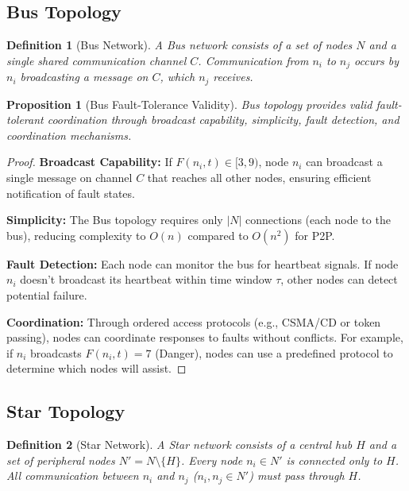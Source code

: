 \documentclass{article}
\newtheorem{proposition}[theorem]{Proposition}
\newtheorem{definition}{Definition}
\begin{document}
\subsection{Bus Topology}

\begin{definition}[Bus Network]
A Bus network consists of a set of nodes $N$ and a single shared communication channel $C$. Communication from $n_i$ to $n_j$ occurs by $n_i$ broadcasting a message on $C$, which $n_j$ receives.
\end{definition}

\begin{proposition}[Bus Fault-Tolerance Validity]
Bus topology provides valid fault-tolerant coordination through broadcast capability, simplicity, fault detection, and coordination mechanisms.
\end{proposition}

\begin{proof}
\textbf{Broadcast Capability:} If $F(n_i, t) \in [3, 9)$, node $n_i$ can broadcast a single message on channel $C$ that reaches all other nodes, ensuring efficient notification of fault states.

\textbf{Simplicity:} The Bus topology requires only $|N|$ connections (each node to the bus), reducing complexity to $O(n)$ compared to $O(n^2)$ for P2P.

\textbf{Fault Detection:} Each node can monitor the bus for heartbeat signals. If node $n_i$ doesn't broadcast its heartbeat within time window $\tau$, other nodes can detect potential failure.

\textbf{Coordination:} Through ordered access protocols (e.g., CSMA/CD or token passing), nodes can coordinate responses to faults without conflicts. For example, if $n_i$ broadcasts $F(n_i, t) = 7$ (Danger), nodes can use a predefined protocol to determine which nodes will assist.
\end{proof}

\subsection{Star Topology}

\begin{definition}[Star Network]
A Star network consists of a central hub $H$ and a set of peripheral nodes $N' = N \setminus \{H\}$. Every node $n_i \in N'$ is connected only to $H$. All communication between $n_i$ and $n_j$ ($n_i, n_j \in N'$) must pass through $H$.
\end{definition}
\end{document}
